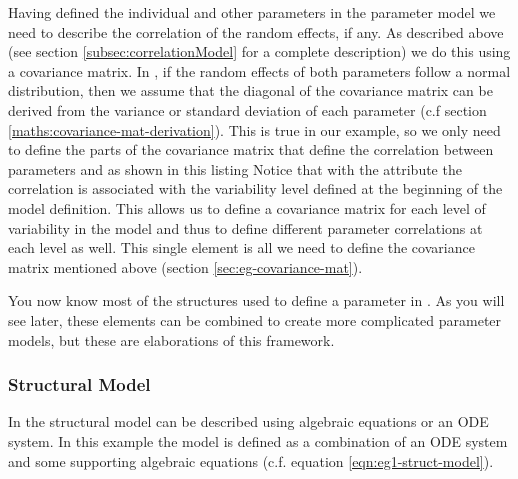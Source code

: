 Having defined the individual and other parameters in the parameter
model we need to describe the correlation of the random effects, if any.
As described above (see section \ref{subsec:correlationModel} for
a complete description) we do this using a covariance matrix.
In \pharmml, if the random effects of both
parameters follow a normal distribution, then we assume that the
diagonal of the covariance matrix can be derived from the variance or
standard deviation of each parameter (c.f section
\ref{maths:covariance-mat-derivation}). This is true in our example,
so we only need to define the parts of the covariance matrix that
define the correlation between parameters  and 
as shown in this listing 
Notice that with the
 attribute the correlation is associated with the
variability level defined at the beginning of the model
definition. This allows us to define a covariance matrix for each
level of variability in the model and thus to define different
parameter correlations at each level as well. This single
 element is all we need to define the covariance
matrix mentioned above (section \ref{sec:eg-covariance-mat}).


You now know most of the structures used to define a parameter in
\pharmml. As you will see later, these elements can be combined to
create more complicated parameter models, but these are elaborations
of this framework.

\subsubsection{Structural Model}

In \pharmml the structural model can be described using algebraic
equations or an ODE system. In this example the
model is defined as a combination of an ODE system and
some supporting algebraic equations (c.f.\xspace equation \ref{eqn:eg1-struct-model}).


